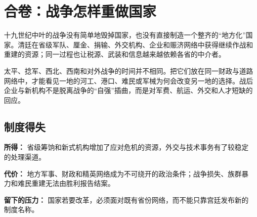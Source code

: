 \section{合卷：战争怎样重做国家}

十九世纪中叶的战争没有简单地毁掉国家，也没有直接制造一个整齐的“地方化”国家。清廷在省级军队、厘金、捐输、外交机构、企业和赈济网络中获得继续作战和重建的资源；同一过程也让税源、武装和信息越来越依赖各省的中介者。

太平、捻军、西北、西南和对外战争的时间并不相同。把它们放在同一财政与道路网络中，才能看见一地的河工、港口、难民或军械为何会改变另一地的选择。战后企业与新机构不是脱离战争的“自强”插曲，而是对军费、航运、外交和人才短缺的回应。

\subsection{制度得失}

\textbf{所得：} 省级筹饷和新式机构增加了应对危机的资源，外交与技术事务有了较稳定的处理渠道。

\textbf{代价：} 地方军事、财政和精英网络成为不可绕开的政治条件；战争损失、族群暴力和难民重建无法由胜利报告结案。

\textbf{留下的压力：} 国家若要改革，必须面对既有省份网络，而不能只靠宫廷发布新的制度名称。
